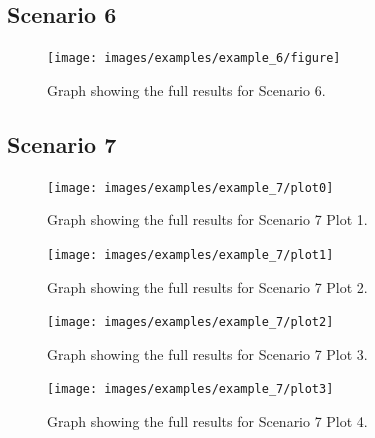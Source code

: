\documentclass{l4proj}
\begin{document}
\clearpage
\subsection{Scenario 6}\label{apen:scen6}

\begin{figure}[htbp]
    \centering
    \texttt{[image: images/examples/example\_6/figure]}
    ~
    \caption{Graph showing the full results for Scenario 6.}
    \label{fig:example6}
\end{figure}

\clearpage
\subsection{Scenario 7}\label{apen:scen7}

\begin{figure}[htbp]
    \centering
    \texttt{[image: images/examples/example\_7/plot0]}
    ~
    \caption{Graph showing the full results for Scenario 7 Plot 1.}
    \label{fig:example7_plot1}
\end{figure}

\clearpage

\begin{figure}[htbp]
    \centering
    \texttt{[image: images/examples/example\_7/plot1]}
    ~
    \caption{Graph showing the full results for Scenario 7 Plot 2.}
    \label{fig:example7_plo2}
\end{figure}

\clearpage
\begin{figure}[htbp]
    \centering
    \texttt{[image: images/examples/example\_7/plot2]}
    ~
    \caption{Graph showing the full results for Scenario 7 Plot 3.}
    \label{fig:example7_plot3}
\end{figure}

\clearpage
\begin{figure}[htbp]
    \centering
    \texttt{[image: images/examples/example\_7/plot3]}
    ~
    \caption{Graph showing the full results for Scenario 7 Plot 4.}
    \label{fig:example7_plot4}
\end{figure}




\renewcommand{\thechapter}{0}

\end{document}
